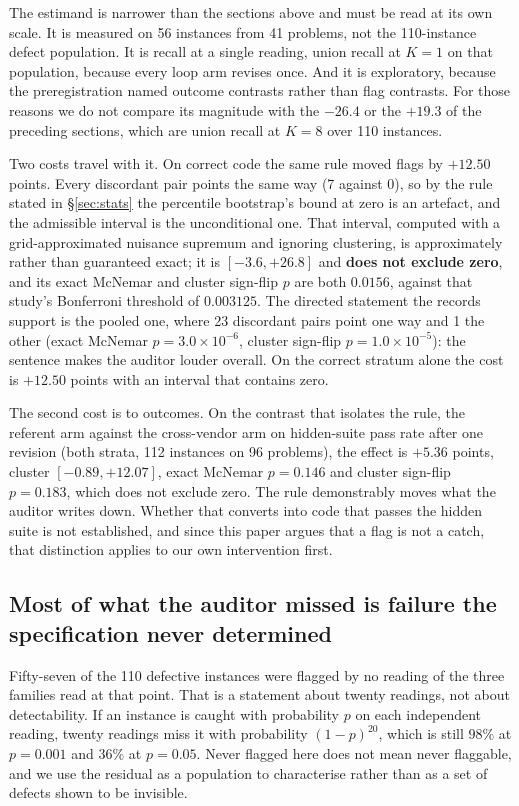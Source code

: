 The estimand is narrower than the sections above and must be read at its own scale. It is measured
on 56 instances from 41 problems, not the 110-instance defect population. It is recall at a single
reading, union recall at $K = 1$ on that population, because every loop arm revises once. And it
is exploratory, because the preregistration named outcome contrasts rather than flag contrasts. For
those reasons we do not compare its magnitude with the $-26.4$ or the $+19.3$ of the preceding
sections, which are union recall at $K=8$ over 110 instances.

Two costs travel with it. On correct code the same rule moved flags by $+12.50$ points. Every
discordant pair points the same way (7 against 0), so by the rule stated in \S\ref{sec:stats} the
percentile bootstrap's bound at zero is an artefact, and the admissible interval is the
unconditional one. That interval, computed with a grid-approximated nuisance supremum and ignoring
clustering, is approximately rather than guaranteed exact; it is $[-3.6, +26.8]$ and
\textbf{does not exclude zero}, and its exact McNemar and cluster sign-flip $p$ are both $0.0156$,
against that study's Bonferroni threshold of $0.003125$. The directed statement the records
support is the pooled one, where 23 discordant pairs point one way and 1 the other (exact McNemar
$p = 3.0\times10^{-6}$, cluster sign-flip $p = 1.0\times10^{-5}$): the sentence makes the auditor
louder overall. On the correct stratum alone the cost is $+12.50$ points with an interval that
contains zero.

The second cost is to outcomes. On the contrast that isolates the rule, the referent arm against
the cross-vendor arm on hidden-suite pass rate after one revision (both strata, 112 instances on
96 problems), the effect is $+5.36$ points, cluster $[-0.89, +12.07]$, exact McNemar $p = 0.146$
and cluster sign-flip $p = 0.183$, which does not exclude zero. The rule demonstrably moves what
the auditor writes down. Whether that converts into code that passes the hidden suite is not
established, and since this paper argues that a flag is not a catch, that distinction applies to
our own intervention first.


\subsection{Most of what the auditor missed is failure the specification never determined}
\label{sec:residual}

Fifty-seven of the 110 defective instances were flagged by no reading of the three families read
at that point. That is a statement about twenty readings, not about detectability. If an instance
is caught with probability $p$ on each independent reading, twenty readings miss it with
probability $(1-p)^{20}$, which is still $98\%$ at $p = 0.001$ and $36\%$ at $p = 0.05$. Never
flagged here does not mean never flaggable, and we use the residual as a population to
characterise rather than as a set of defects shown to be invisible.


